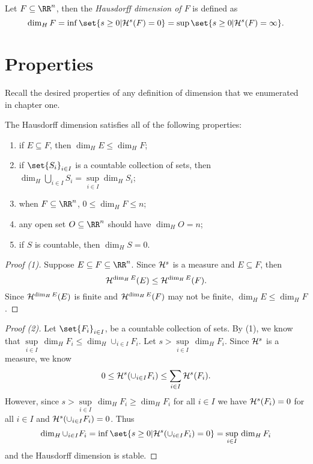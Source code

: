 \begin{definition}
	Let $F\subseteq\RR^n$, then the \textit{Hausdorff dimension of $F$} is defined as
	\[
		\dim_H F = \inf\set{s\geq 0 | \hm^s(F) = 0} = \sup\set{s\geq 0 | \hm^s(F)=\infty}.
	\]
\end{definition}

\section{Properties}

Recall the desired properties of any definition of dimension that we enumerated in chapter one.

\begin{thm}
	The Hausdorff dimension satisfies all of the following properties:
	\begin{enumerate}
		\item if $E\subseteq F$, then $\dim_H E\leq\dim_H F$;
		\item if $\set{S_i}_{i\in I}$ is a countable collection of sets, then $\dim_H \bigcup_{i\in I} S_i = \sup\limits_{i\in I}\dim_H S_i$;
		\item when $F\subseteq \RR^n$, $0\leq \dim_H F\leq n$;
		\item any open set $O\subseteq \RR^n$ should have $\dim_H O = n$;
		\item if $S$ is countable, then $\dim_H S=0$.
	\end{enumerate}
\end{thm}

\begin{proof}[Proof (1)]
	Suppose $E\subseteq F\subseteq\RR^n$.
	Since $\mathcal{H}^s$ is a measure and $E\subseteq F$, then
	\[
		\mathcal{H}^{\operatorname{dim}_H E} (E) \leq \mathcal{H}^{\operatorname{dim}_H E} (F).
	\]
	Since $\mathcal{H}^{\operatorname{dim}_H E}(E)$ is finite and $\mathcal{H}^{\operatorname{dim}_H E}(F)$ may not be finite, $\dim_H E \leq \dim_H F$.
\end{proof}

\begin{proof}[Proof (2)]
	Let $\set{F_i}_{i\in I}$, be a countable collection of sets.
	By (1), we know that $\sup\limits_{i\in I}\, \dim_H F_i \leq\dim_H \cup_{i\in I} F_i$.
	Let $s > \sup\limits_{i\in I}\, \dim_H F_i$.
	Since $\mathcal{H}^s$ is a measure, we know
	\[
		0\leq \mathcal{H}^s (\cup_{i\in I} F_i) \leq \sum_{i\in I} \mathcal{H}^s(F_i).
	\]
	However, since $s > \sup\limits_{i\in I}\, \dim_H F_i \geq \dim_H F_i$ for all $i\in I$ we have $\mathcal{H}^s(F_i)=0$ for all $i\in I$ and $\mathcal{H}^s (\cup_{i\in I} F_i) = 0$.
	Thus
	\[
		\dim_H \cup_{i\in I} F_i = \inf\set{s\geq 0 | \hm^s(\cup_{i\in I} F_i) = 0} =\sup\limits_{i\in I}\, \dim_H F_i
	\]
	and the Hausdorff dimension is stable.
\end{proof}

